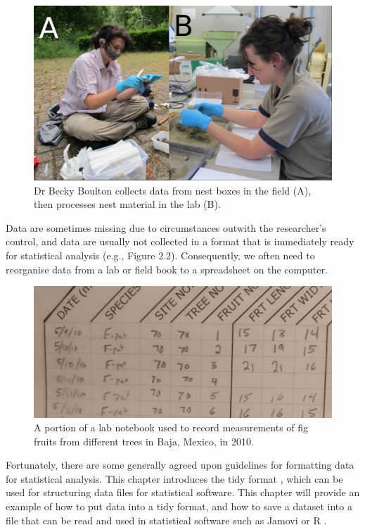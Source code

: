 \documentclass[
]{scrbook}
\begin{document}
\begin{figure}
\includegraphics[width=1\linewidth]{img/becky_field} \caption{Dr Becky Boulton collects data from nest boxes in the field (A), then processes nest material in the lab (B).}\label{fig:unnamed-chunk-4}
\end{figure}

Data are sometimes missing due to circumstances outwith the researcher's control, and data are usually not collected in a format that is immediately ready for statistical analysis (e.g., Figure 2.2).
Consequently, we often need to reorganise data from a lab or field book to a spreadsheet on the computer.

\begin{figure}
\includegraphics[width=1\linewidth]{img/handwritten_data} \caption{A portion of a lab notebook used to record measurements of fig fruits from different trees in Baja, Mexico, in 2010.}\label{fig:unnamed-chunk-5}
\end{figure}

Fortunately, there are some generally agreed upon guidelines for formatting data for statistical analysis.
This chapter introduces the tidy format \citep{Wickham2014}, which can be used for structuring data files for statistical software.
This chapter will provide an example of how to put data into a tidy format, and how to save a dataset into a file that can be read and used in statistical software such as Jamovi or R \citep{Jamovi2022, Rproject}.
\end{document}
